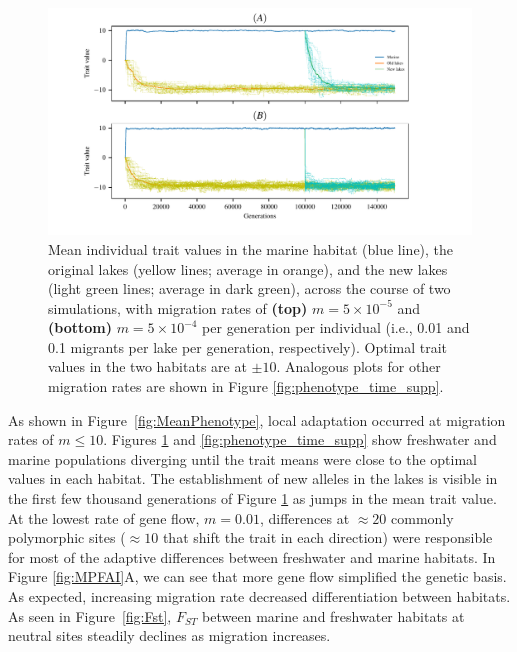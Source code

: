 \documentclass{article}
\begin{document}
\begin{figure}
	\begin{center}
        \includegraphics{Final_Plots/Pheno_Time.pdf}
  		\caption{ 
        		Mean individual trait values in the marine habitat (blue line),
        		the original lakes (yellow lines; average in orange),
        		and the new lakes (light green lines; average in dark green),
        		across the course of two simulations, with migration rates of
        		\textbf{(top)} $m=5 \times 10^{-5}$ and
        		\textbf{(bottom)} $m=5 \times 10^{-4}$ per generation per individual
        		(i.e., 0.01 and 0.1 migrants per lake per generation, respectively).
        		Optimal trait values in the two habitats are at $\pm 10$.
                	Analogous plots for other migration rates
                	are shown in Figure \ref{fig:phenotype_time_supp}.
		}
  		\label{fig:phenotype_time}
	\end{center}
\end{figure}

As shown in Figure~\ref{fig:MeanPhenotype}, local adaptation occurred at migration rates of $m \le 10$.
Figures \ref{fig:phenotype_time} and \ref{fig:phenotype_time_supp}
show freshwater and marine populations diverging until the trait means were close to the optimal values in each habitat. 
The establishment of new alleles in the lakes is visible in the first few thousand generations of Figure \ref{fig:phenotype_time} as jumps in the mean trait value.
At the lowest rate of gene flow, $m = 0.01$, differences at $\approx 20$ commonly polymorphic sites 
($\approx 10$ that shift the trait in each direction)
were responsible for most of the adaptive differences between freshwater and marine habitats.
In Figure \ref{fig:MPFAI}A, we can see that more gene flow simplified the genetic basis. %
As expected, increasing migration rate decreased differentiation between habitats. 
As seen in Figure~\ref{fig:Fst}, 
$F_{ST}$ between marine and freshwater habitats 
at neutral sites steadily declines as migration increases. 
\end{document}
